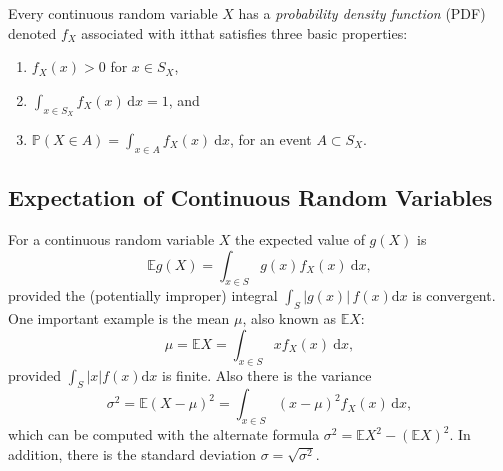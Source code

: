 Every continuous random variable \(X\) has a \emph{probability density
function} (PDF) denoted \(f_{X}\) associated with itthat
satisfies three basic properties:
\begin{enumerate}
\item \(f_{X}(x)>0\) for \(x\in S_{X}\),
\item \(\int_{x\in S_{X}}f_{X}(x)\,\mathrm{d} x=1\), and
\item \label{enu-contrvcond3} \(\mathbb{P}(X\in A)=\int_{x\in
   A}f_{X}(x)\:\mathrm{d} x\), for an event \(A\subset S_{X}\).
\end{enumerate}

\subsection{Expectation of Continuous Random Variables}
\label{sec-6-1-2}

For a continuous random variable \(X\) the expected value of \(g(X)\)
is
\begin{equation}
\mathbb{E} g(X)=\int_{x\in S}g(x)f_{X}(x)\:\mathrm{d} x,
\end{equation}
provided the (potentially improper) integral \(\int_{S}|g(x)|\,
f(x)\mathrm{d} x\) is convergent. One important example is the mean
\(\mu\), also known as \(\mathbb{E} X\):
\begin{equation}
\mu=\mathbb{E} X=\int_{x\in S}xf_{X}(x)\:\mathrm{d} x,
\end{equation}
provided \(\int_{S}|x|f(x)\mathrm{d} x\) is finite. Also there is the variance
\begin{equation}
\sigma^{2}=\mathbb{E}(X-\mu)^{2}=\int_{x\in S}(x-\mu)^{2}f_{X}(x)\,\mathrm{d} x,
\end{equation}
which can be computed with the alternate formula
\(\sigma^{2}=\mathbb{E} X^{2}-(\mathbb{E} X)^{2}\). In addition, there
is the standard deviation \(\sigma=\sqrt{\sigma^{2}}\).

